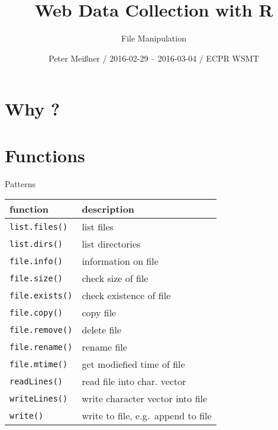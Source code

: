 \documentclass[ignorenonframetext,]{beamer}
\title{Web Data Collection with R}
\subtitle{File Manipulation}
\author{Peter Meißner / 2016-02-29 -- 2016-03-04 / ECPR WSMT}
\date{}
\begin{document}
\frame{\titlepage}

\begin{frame}
\tableofcontents[hideallsubsections]
\end{frame}

\section{Why ?}\label{why}

\section{Functions}\label{functions}

\begin{frame}[fragile]{Patterns}

\begin{longtable}[c]{@{}ll@{}}
\toprule
function & description\tabularnewline
\midrule
\endhead
\texttt{list.files()} & list files\tabularnewline
\texttt{list.dirs()} & list directories\tabularnewline
\texttt{file.info()} & information on file\tabularnewline
\texttt{file.size()} & check size of file\tabularnewline
\texttt{file.exists()} & check existence of file\tabularnewline
\texttt{file.copy()} & copy file\tabularnewline
\texttt{file.remove()} & delete file\tabularnewline
\texttt{file.rename()} & rename file\tabularnewline
\texttt{file.mtime()} & get modiefied time of file\tabularnewline
\texttt{readLines()} & read file into char. vector\tabularnewline
\texttt{writeLines()} & write character vector into file\tabularnewline
\texttt{write()} & write to file, e.g.~append to file\tabularnewline
\bottomrule
\end{longtable}

~

\end{frame}
\end{document}
